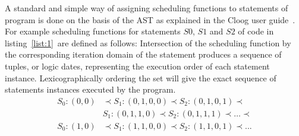 A standard and simple way of assigning scheduling functions to statements of
program is done on the basis of the AST as explained in the Cloog user
guide~\cite{cloog}.
For example scheduling functions
for statements $S0$, $S1$ and $S2$ of code in listing~\ref{list:1}~are defined
as follows:
% 
% 
Intersection of the scheduling function by the corresponding iteration domain of
the statement produces a sequence of tuples, or logic dates, representing
the execution order of each statement instance. Lexicographically 
ordering the set will give the exact sequence of statements instances executed
by the program. %
\begin{align*}
	S_0:(0,0) & \prec S_1:(0,1,0,0) \prec S_2:(0,1,0,1) \prec \\ 
			  & S_1:(0,1,1,0) \prec S_2:(0,1,1,1) \prec \ldots \prec \\
	S_0:(1,0) & \prec S_1:(1,1,0,0) \prec S_2:(1,1,0,1) \prec ...
\end{align*}


